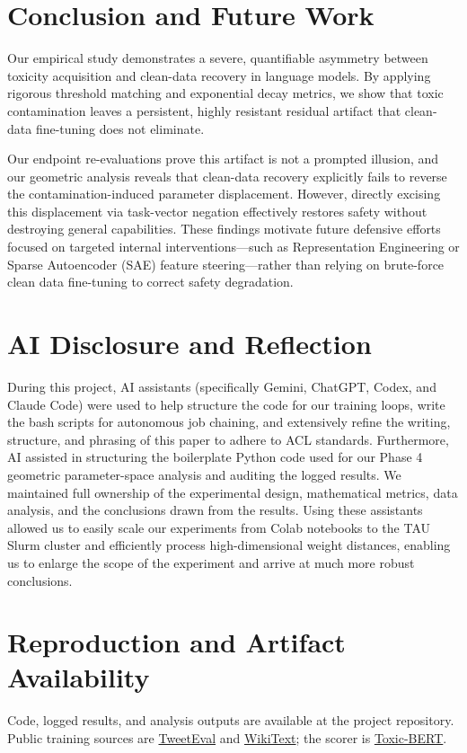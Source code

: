 \documentclass[11pt,a4paper]{article}
\begin{document}
\section{Conclusion and Future Work}
Our empirical study demonstrates a severe, quantifiable asymmetry between toxicity acquisition and clean-data recovery in language models. By applying rigorous threshold matching and exponential decay metrics, we show that toxic contamination leaves a persistent, highly resistant residual artifact that clean-data fine-tuning does not eliminate. 

Our endpoint re-evaluations prove this artifact is not a prompted illusion, and our geometric analysis reveals that clean-data recovery explicitly fails to reverse the contamination-induced parameter displacement. However, directly excising this displacement via task-vector negation effectively restores safety without destroying general capabilities. These findings motivate future defensive efforts focused on targeted internal interventions---such as Representation Engineering or Sparse Autoencoder (SAE) feature steering---rather than relying on brute-force clean data fine-tuning to correct safety degradation.

\section*{AI Disclosure and Reflection}
During this project, AI assistants (specifically Gemini, ChatGPT, Codex, and Claude Code) were used to help structure the code for our training loops, write the bash scripts for autonomous job chaining, and extensively refine the writing, structure, and phrasing of this paper to adhere to ACL standards. Furthermore, AI assisted in structuring the boilerplate Python code used for our Phase 4 geometric parameter-space analysis and auditing the logged results. We maintained full ownership of the experimental design, mathematical metrics, data analysis, and the conclusions drawn from the results. Using these assistants allowed us to easily scale our experiments from Colab notebooks to the TAU Slurm cluster and efficiently process high-dimensional weight distances, enabling us to enlarge the scope of the experiment and arrive at much more robust conclusions.




\appendix
\section{Reproduction and Artifact Availability}
\label{app:repro}
Code, logged results, and analysis outputs are available at the project repository. Public training sources are \href{https://huggingface.co/datasets/cardiffnlp/tweet_eval}{TweetEval} and \href{https://huggingface.co/datasets/Salesforce/wikitext}{WikiText}; the scorer is \href{https://huggingface.co/unitary/toxic-bert}{Toxic-BERT}.
\end{document}

